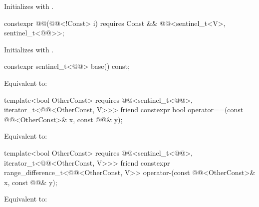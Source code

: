 \begin{itemdescr}
\pnum
\effects
Initializes  with .
\end{itemdescr}

%
\begin{itemdecl}
constexpr @@(@@<!Const> i)
  requires Const && @@<sentinel_t<V>, sentinel_t<@@>>;
\end{itemdecl}

\begin{itemdescr}
\pnum
\effects
Initializes  with .
\end{itemdescr}

\begin{itemdecl}
constexpr sentinel_t<@@> base() const;
\end{itemdecl}

\begin{itemdescr}
\pnum
\effects
Equivalent to: 
\end{itemdescr}

\begin{itemdecl}
template<bool OtherConst>
  requires @@<sentinel_t<@@>, iterator_t<@@<OtherConst, V>>>
friend constexpr bool operator==(const @@<OtherConst>& x, const @@& y);
\end{itemdecl}

\begin{itemdescr}
\pnum
\effects
Equivalent to: 
\end{itemdescr}

%
\begin{itemdecl}
template<bool OtherConst>
  requires @@<sentinel_t<@@>, iterator_t<@@<OtherConst, V>>>
friend constexpr range_difference_t<@@<OtherConst, V>>
  operator-(const @@<OtherConst>& x, const @@& y);
\end{itemdecl}

\begin{itemdescr}
\pnum
\effects
Equivalent to: 
\end{itemdescr}

